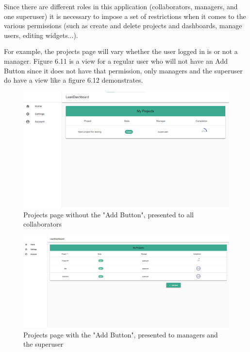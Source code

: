 \documentclass[a4paper,twoside,10pt]{report}
\begin{document}
Since there are different roles in this application (collaborators, managers, and one superuser) it is necessary to impose a set of restrictions when it comes to the various permissions (such as create and delete projects and dashboards, manage users, editing widgets...).

For example, the projects page will vary whether the user logged in is or not a manager. Figure 6.11 is a view for a regular user who will not have an Add Button since it does not have that permission, only managers and the superuser do have a view like a figure 6.12 demonstrates. 

\begin{figure}[h!]
\center
  \includegraphics[width=\textwidth]{projectsPageNoAddButton.png}
\caption{Projects page without the "Add Button", presented to all collaborators}
\end{figure}

\begin{figure}[h!]
\center
  \includegraphics[width=\textwidth]{projectsPage.png}
\caption{Projects page with the "Add Button", presented to managers and the superuser }
\end{figure}
\end{document}
